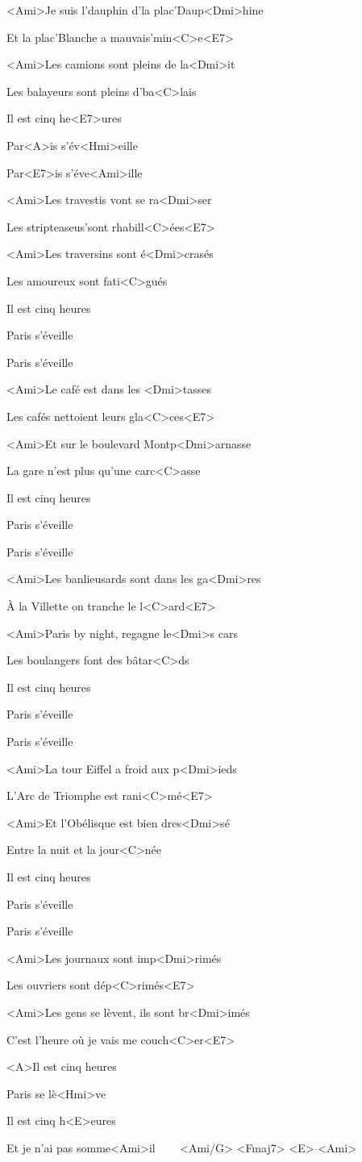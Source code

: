 

\zs
<Ami>Je suis l'dauphin d'la plac'Daup<Dmi>hine

Et la plac'Blanche a mauvais'min<C>e<E7>

<Ami>Les camions sont pleins de la<Dmi>it

Les balayeurs sont pleins d'ba<C>lais

Il est cinq he<E7>ures

Par<A>is s'év<Hmi>eille

Par<E7>is s'éve<Ami>ille
\ks

\zs
<Ami>Les travestis vont se ra<Dmi>ser

Les stripteaseus'sont rhabill<C>ées<E7>

<Ami>Les traversins sont é<Dmi>crasés

Les amoureux sont fati<C>gués

Il est cinq heures

Paris s'éveille

Paris s'éveille
\ks

\zs
<Ami>Le café est dans les <Dmi>tasses

Les cafés nettoient leurs gla<C>ces<E7>

<Ami>Et sur le boulevard Montp<Dmi>arnasse

La gare n'est plus qu'une carc<C>asse

Il est cinq heures

Paris s'éveille

Paris s'éveille
\ks

\zs
<Ami>Les banlieusards sont dans les ga<Dmi>res

À la Villette on tranche le l<C>ard<E7>

<Ami>Paris by night, regagne le<Dmi>s cars

Les boulangers font des bâtar<C>ds

Il est cinq heures

Paris s'éveille

Paris s'éveille
\ks

\zs
<Ami>La tour Eiffel a froid aux p<Dmi>ieds

L'Arc de Triomphe est rani<C>mé<E7>

<Ami>Et l'Obélisque est bien dres<Dmi>sé

Entre la nuit et la jour<C>née

Il est cinq heures

Paris s'éveille

Paris s'éveille
\ks

\zs
<Ami>Les journaux sont imp<Dmi>rimés

Les ouvriers sont dép<C>rimés<E7>

<Ami>Les gens se lèvent, ils sont br<Dmi>imés

C'est l'heure où je vais me couch<C>er<E7>

<A>Il est cinq heures

Paris se lè<Hmi>ve

Il est cinq h<E>eures

Et je n'ai pas somme<Ami>il ~~~ <Ami/G> <Fmaj7> <E> <Ami>
\ks

\kp
